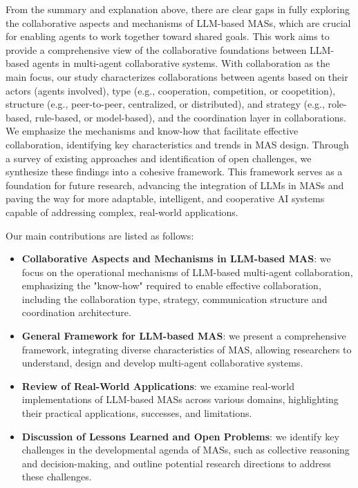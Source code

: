 \documentclass[acmsmall,nonacm]{acmart}
\begin{document}
        From the summary and explanation above, there are clear gaps in fully exploring the collaborative aspects and mechanisms of LLM-based MASs, which are crucial for enabling agents to work together toward shared goals. This work aims to provide a comprehensive view of the collaborative foundations between LLM-based agents in multi-agent collaborative systems. With collaboration as the main focus, our study characterizes collaborations between agents based on their actors (agents involved), type (e.g., cooperation, competition, or coopetition), structure (e.g., peer-to-peer, centralized, or distributed), and strategy (e.g., role-based, rule-based, or model-based), and the coordination layer in collaborations. We emphasize the mechanisms and know-how that facilitate effective collaboration, identifying key characteristics and trends in MAS design. Through a survey of existing approaches and identification of open challenges, we synthesize these findings into a cohesive framework. This framework serves as a foundation for future research, advancing the integration of LLMs in MASs and paving the way for more adaptable, intelligent, and cooperative AI systems capable of addressing complex, real-world applications.
		
        Our main contributions are listed as follows:
        \begin{itemize}
            \item \textbf{Collaborative Aspects and Mechanisms in LLM-based MAS}: we focus on the operational mechanisms of LLM-based multi-agent collaboration, emphasizing the "know-how" required to enable effective collaboration, including the collaboration type, strategy, communication structure and coordination architecture.
            \item \textbf{General Framework for LLM-based MAS}: we present a comprehensive framework, integrating diverse characteristics of MAS, allowing researchers to understand, design and develop multi-agent collaborative systems.
            \item \textbf{Review of Real-World Applications}: we examine real-world implementations of LLM-based MASs across various domains, highlighting their practical applications, successes, and limitations.
            \item \textbf{Discussion of Lessons Learned and Open Problems}: we identify key challenges in the developmental agenda of MASs, such as collective reasoning and decision-making, and outline potential research directions to address these challenges.
        \end{itemize}
\end{document}
